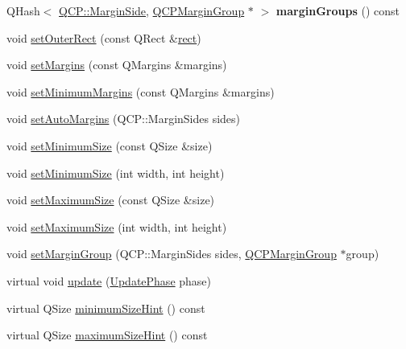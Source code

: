 \begin{DoxyCompactItemize}
\item 
\mbox{\label{class_q_c_p_layout_element_ac8d1139a81a1625860647e307ae2b733}} 
Q\+Hash$<$ \hyperlink{namespace_q_c_p_a7e487e3e2ccb62ab7771065bab7cae54}{Q\+C\+P\+::\+Margin\+Side}, \hyperlink{class_q_c_p_margin_group}{Q\+C\+P\+Margin\+Group} $\ast$ $>$ {\bfseries margin\+Groups} () const
\item 
void \hyperlink{class_q_c_p_layout_element_a38975ea13e36de8e53391ce41d94bc0f}{set\+Outer\+Rect} (const Q\+Rect \&\hyperlink{class_q_c_p_layout_element_a208effccfe2cca4a0eaf9393e60f2dd4}{rect})
\item 
void \hyperlink{class_q_c_p_layout_element_a8f450b1f3f992ad576fce2c63d8b79cf}{set\+Margins} (const Q\+Margins \&margins)
\item 
void \hyperlink{class_q_c_p_layout_element_a0a8a17abc16b7923159fcc7608f94673}{set\+Minimum\+Margins} (const Q\+Margins \&margins)
\item 
void \hyperlink{class_q_c_p_layout_element_accfda49994e3e6d51ed14504abf9d27d}{set\+Auto\+Margins} (Q\+C\+P\+::\+Margin\+Sides sides)
\item 
void \hyperlink{class_q_c_p_layout_element_a5dd29a3c8bc88440c97c06b67be7886b}{set\+Minimum\+Size} (const Q\+Size \&size)
\item 
void \hyperlink{class_q_c_p_layout_element_a8e0447614a0bf92de9a7304588c6b96e}{set\+Minimum\+Size} (int width, int height)
\item 
void \hyperlink{class_q_c_p_layout_element_a74eb5280a737ab44833d506db65efd95}{set\+Maximum\+Size} (const Q\+Size \&size)
\item 
void \hyperlink{class_q_c_p_layout_element_a03e0e9c48f230217c529b0819f832d84}{set\+Maximum\+Size} (int width, int height)
\item 
void \hyperlink{class_q_c_p_layout_element_a516e56f76b6bc100e8e71d329866847d}{set\+Margin\+Group} (Q\+C\+P\+::\+Margin\+Sides sides, \hyperlink{class_q_c_p_margin_group}{Q\+C\+P\+Margin\+Group} $\ast$group)
\item 
virtual void \hyperlink{class_q_c_p_layout_element_a929c2ec62e0e0e1d8418eaa802e2af9b}{update} (\hyperlink{class_q_c_p_layout_element_a0d83360e05735735aaf6d7983c56374d}{Update\+Phase} phase)
\item 
virtual Q\+Size \hyperlink{class_q_c_p_layout_element_ab3fdb5c9a5189bb2dac10d4d25329cd8}{minimum\+Size\+Hint} () const
\item 
virtual Q\+Size \hyperlink{class_q_c_p_layout_element_ab5ce2ba22b36d9a3b70a1be562c326e5}{maximum\+Size\+Hint} () const

\end{DoxyCompactItemize}
